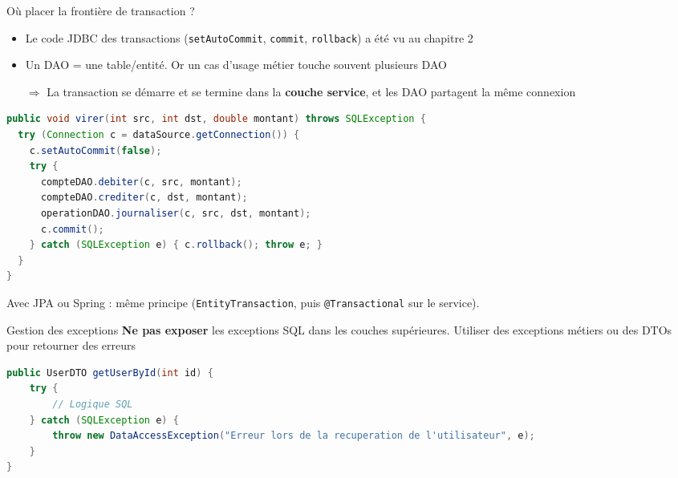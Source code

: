 \documentclass[aspectratio=169,10pt]{beamer}
\begin{document}
\begin{frame}[fragile]{O\`u placer la fronti\`ere de transaction ?}
  \begin{itemize}
    \item Le code JDBC des transactions (\texttt{setAutoCommit}, \texttt{commit}, \texttt{rollback}) a \'et\'e vu au \alert{chapitre 2}
    \item Un DAO = une table/entit\'e. Or un cas d'usage m\'etier touche souvent \alert{plusieurs DAO}
    \item[$\Rightarrow$] La transaction se d\'emarre et se termine dans la \textbf{couche service}, et les DAO partagent la m\^eme connexion
  \end{itemize}
\begin{lstlisting}[language=Java]
public void virer(int src, int dst, double montant) throws SQLException {
  try (Connection c = dataSource.getConnection()) {
    c.setAutoCommit(false);
    try {
      compteDAO.debiter(c, src, montant);
      compteDAO.crediter(c, dst, montant);
      operationDAO.journaliser(c, src, dst, montant);
      c.commit();
    } catch (SQLException e) { c.rollback(); throw e; }
  }
}
\end{lstlisting}
  {\small\color{qamuted} Avec JPA ou Spring : m\^eme principe (\texttt{EntityTransaction}, puis \texttt{@Transactional} sur le service).}
\end{frame}

\begin{frame}[fragile]{Gestion des exceptions}
\textbf{Ne pas exposer} les exceptions SQL dans les couches supérieures.
Utiliser des exceptions métiers ou des DTOs pour retourner des erreurs
\begin{lstlisting}[language=Java]  
public UserDTO getUserById(int id) {
    try {
        // Logique SQL
    } catch (SQLException e) {
        throw new DataAccessException("Erreur lors de la recuperation de l'utilisateur", e);
    }
}

\end{lstlisting}
\end{frame}
\end{document}
